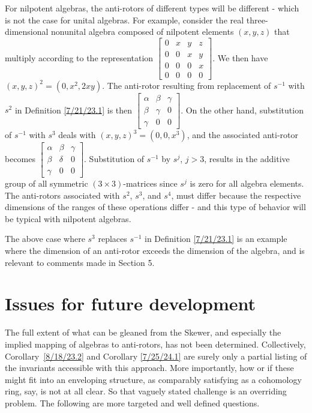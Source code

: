 \documentclass{amsart}
\numberwithin{equation}{section}
\theoremstyle{definition}
\numberwithin{theorem}{section}
\begin{document}
For nilpotent algebras, the anti-rotors of different types will be different - which is not the case for unital algebras.  For example, consider the real three-dimensional nonunital algebra composed of nilpotent elements $(x,y,z)$ that multiply according to the representation
  $ \left[
\begin{array}{ccccc}
0 & x & y & z  \\
0 & 0 & x & y \\
0 & 0 & 0 & x \\
0 & 0 & 0 & 0
\end{array}
\right] $.  We then have $(x,y,z)^2 = (0,x^2, 2xy)$.  The anti-rotor resulting from replacement of $s^{-1}$ with  $s^2$ in Definition \ref{7/21/23.1} is then $\left[
\begin{array}{ccccc}
\alpha & \beta & \gamma   \\
\beta & \gamma & 0 \\
\gamma & 0 & 0  
\end{array}
\right] $.  On the other hand, substitution of $s^{-1}$ with $s^3$  deals with $(x,y,z)^3 = (0,0, x^3)$, and the associated anti-rotor becomes $\left[
\begin{array}{ccccc}
\alpha & \beta & \gamma   \\
\beta & \delta & 0 \\
\gamma & 0 & 0  
\end{array}
\right] $.  Substitution of $s^{-1}$ by $s^j$, $j>3$, results in the additive group of all symmetric $(3\times 3)$-matrices since $s^j$ is zero for all algebra elements.  The anti-rotors associated with $s^2$, $s^3$, and $s^4$, must differ because the respective dimensions of the ranges of these operations differ - and this type of behavior will be typical with nilpotent algebras.  
 
The above case where $s^3$ replaces $s^{-1}$ in Definition \ref{7/21/23.1} is an example where the dimension of an anti-rotor exceeds the dimension of the algebra, and is relevant to comments made in Section 5.



\section{Issues for future development} 
The full extent of what can be gleaned from the Skewer, and especially the implied mapping of algebras to anti-rotors, has not been determined.  Collectively, \mbox{Corollary \ref{8/18/23.2}} and Corollary \ref{7/25/24.1} are surely only a partial listing of the invariants accessible with this approach.  More importantly, how or if these might fit into an enveloping structure, as comparably satisfying as a cohomology ring, say, is not at all clear.  So that vaguely stated challenge is an overriding problem.  The following are more targeted and well defined questions. 
 
\end{document}

